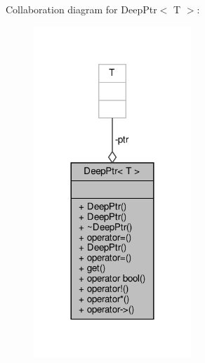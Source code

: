 Collaboration diagram for Deep\+Ptr$<$ T $>$\+:\nopagebreak
\begin{figure}[H]
\begin{center}
\leavevmode
\includegraphics[width=168pt]{classDeepPtr__coll__graph}
\end{center}
\end{figure}
